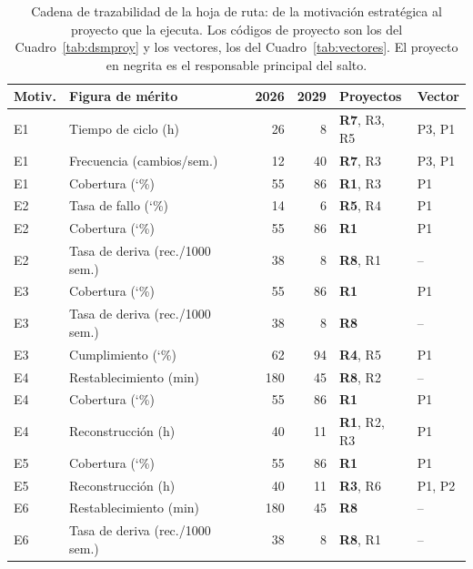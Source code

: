 \documentclass[11pt,letterpaper]{article}
\newcommand{\pct}{\char`\%}  %
\begin{document}
\begin{table}[htbp]
  \centering
  \footnotesize
  \setlength{\tabcolsep}{4pt}
  \caption{Cadena de trazabilidad de la hoja de ruta: de la motivación
  estratégica al proyecto que la ejecuta. Los códigos de proyecto son los del
  Cuadro~\ref{tab:dsmproy} y los vectores, los del Cuadro~\ref{tab:vectores}.
  El proyecto en negrita es el responsable principal del salto.}
  \label{tab:trazafom}
  \begin{tabular}{@{}llrrll@{}}
    \toprule
    \textbf{Motiv.} & \textbf{Figura de mérito} & \textbf{2026} &
      \textbf{2029} & \textbf{Proyectos} & \textbf{Vector} \\
    \midrule
    E1 & Tiempo de ciclo (h)             &  26 &   8 & \textbf{R7}, R3, R5 & P3, P1 \\
    E1 & Frecuencia (cambios/sem.)       &  12 &  40 & \textbf{R7}, R3     & P3, P1 \\
    E1 & Cobertura (\pct)                &  55 &  86 & \textbf{R1}, R3     & P1 \\
    \midrule
    E2 & Tasa de fallo (\pct)            &  14 &   6 & \textbf{R5}, R4     & P1 \\
    E2 & Cobertura (\pct)                &  55 &  86 & \textbf{R1}         & P1 \\
    E2 & Tasa de deriva (rec./1000 sem.) &  38 &   8 & \textbf{R8}, R1     & -- \\
    \midrule
    E3 & Cobertura (\pct)                &  55 &  86 & \textbf{R1}         & P1 \\
    E3 & Tasa de deriva (rec./1000 sem.) &  38 &   8 & \textbf{R8}         & -- \\
    E3 & Cumplimiento (\pct)             &  62 &  94 & \textbf{R4}, R5     & P1 \\
    \midrule
    E4 & Restablecimiento (min)          & 180 &  45 & \textbf{R8}, R2     & -- \\
    E4 & Cobertura (\pct)                &  55 &  86 & \textbf{R1}         & P1 \\
    E4 & Reconstrucción (h)              &  40 &  11 & \textbf{R1}, R2, R3 & P1 \\
    \midrule
    E5 & Cobertura (\pct)                &  55 &  86 & \textbf{R1}         & P1 \\
    E5 & Reconstrucción (h)              &  40 &  11 & \textbf{R3}, R6     & P1, P2 \\
    \midrule
    E6 & Restablecimiento (min)          & 180 &  45 & \textbf{R8}         & -- \\
    E6 & Tasa de deriva (rec./1000 sem.) &  38 &   8 & \textbf{R8}, R1     & -- \\
    \bottomrule
  \end{tabular}
\end{table}
\end{document}
